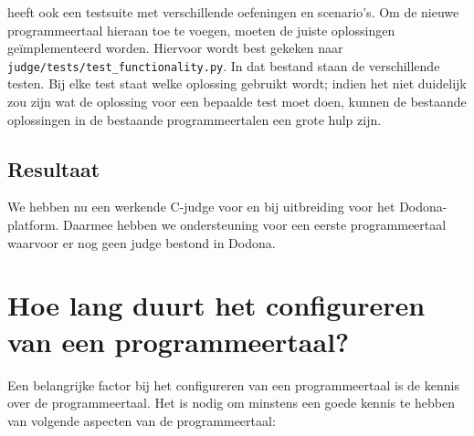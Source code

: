 \tested{} heeft ook een testsuite met verschillende oefeningen en scenario's.
Om de nieuwe programmeertaal hieraan toe te voegen, moeten de juiste oplossingen geïmplementeerd worden.
Hiervoor wordt best gekeken naar \texttt{judge/tests/test\_functionality.py}.
In dat bestand staan de verschillende testen.
Bij elke test staat welke oplossing gebruikt wordt;
indien het niet duidelijk zou zijn wat de oplossing voor een bepaalde test moet doen, kunnen de bestaande oplossingen in de bestaande programmeertalen een grote hulp zijn.

\subsection{Resultaat}\label{subsec:resultaat}

We hebben nu een werkende C-judge voor \tested{} en bij uitbreiding voor het Dodona-platform.
Daarmee hebben we ondersteuning voor een eerste programmeertaal waarvoor er nog geen judge bestond in Dodona.

\section{Hoe lang duurt het configureren van een programmeertaal?}\label{sec:hoe-lang-duurt-het-implementeren-van-een-programmeertaal?}

Een belangrijke factor bij het configureren van een programmeertaal is de kennis over de programmeertaal.
Het is nodig om minstens een goede kennis te hebben van volgende aspecten van de programmeertaal:

